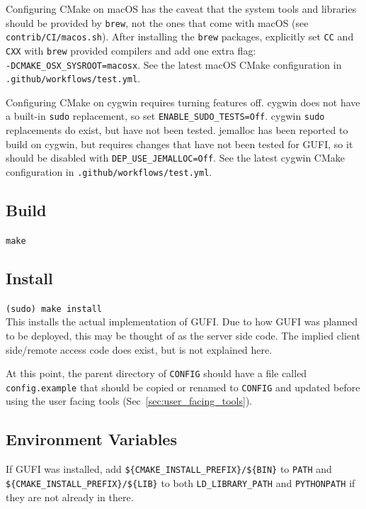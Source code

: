 Configuring CMake on macOS has the caveat that the system tools and
libraries should be provided by \texttt{brew}, not the ones that come
with macOS (see \texttt{contrib/CI/macos.sh}). After installing the
\texttt{brew} packages, explicitly set \texttt{CC} and \texttt{CXX}
with \texttt{brew} provided compilers and add one extra flag: \\
\texttt{-DCMAKE\_OSX\_SYSROOT=macosx}. See the latest macOS CMake
configuration in \texttt{.github/workflows/test.yml}.

Configuring CMake on cygwin requires turning features off. cygwin does
not have a built-in \texttt{sudo} replacement, so set
\texttt{ENABLE\_SUDO\_TESTS=Off}. cygwin \texttt{sudo} replacements do
exist, but have not been tested. jemalloc has been reported to build
on cygwin, but requires changes that have not been tested for GUFI, so
it should be disabled with \texttt{DEP\_USE\_JEMALLOC=Off}. See the
latest cygwin CMake configuration in
\texttt{.github/workflows/test.yml}.

\subsection{Build}
\indent \indent \texttt{make}

\subsection{Install}
\indent \indent \texttt{(sudo) make install} \\

This installs the actual implementation of GUFI. Due to how GUFI was
planned to be deployed, this may be thought of as the server side
code. The implied client side/remote access code does exist, but is
not explained here.

At this point, the parent directory of \texttt{CONFIG} should
have a file called \texttt{config.example} that should be copied or
renamed to \texttt{CONFIG} and updated before using the user
facing tools (Sec~\ref{sec:user_facing_tools}).

\subsection{Environment Variables}
If GUFI was installed, add
\texttt{\$\{CMAKE\_INSTALL\_PREFIX\}/\$\{BIN\}} to \texttt{PATH}
and
\texttt{\$\{CMAKE\_INSTALL\_PREFIX\}/\$\{LIB\}} to both
\texttt{LD\_LIBRARY\_PATH} and \texttt{PYTHONPATH} if they are not
already in there.

